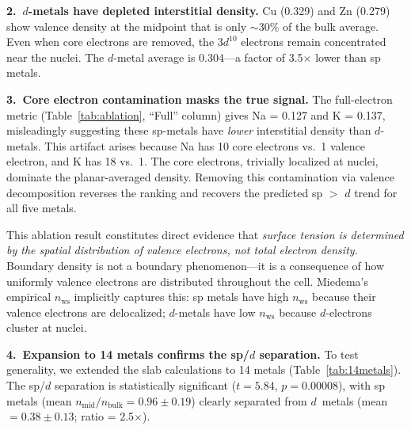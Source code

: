 \documentclass[twocolumn,showpacs,preprintnumbers,amsmath,amssymb,prb]{revtex4-2}
\begin{document}
\textbf{2.\ $d$-metals have depleted interstitial density.}
Cu (0.329) and Zn (0.279) show valence density at the
midpoint that is only $\sim\!30\%$ of the bulk average.
Even when core electrons are removed, the $3d^{10}$
electrons remain concentrated near the nuclei.
The $d$-metal average is 0.304---a factor of 3.5$\times$
lower than sp metals.

\textbf{3.\ Core electron contamination masks the true signal.}
The full-electron metric (Table~\ref{tab:ablation}, ``Full''
column) gives Na = 0.127 and K = 0.137, misleadingly
suggesting these sp-metals have \emph{lower} interstitial
density than $d$-metals.
This artifact arises because Na has 10 core electrons
vs.\ 1 valence electron, and K has 18 vs.\ 1.
The core electrons, trivially localized at nuclei,
dominate the planar-averaged density.
Removing this contamination via valence decomposition
reverses the ranking and recovers the predicted sp $>$ $d$
trend for all five metals.

This ablation result constitutes direct evidence that
\emph{surface tension is determined by the spatial
distribution of valence electrons, not total electron density.}
Boundary density is not a boundary phenomenon---it is a
consequence of how uniformly valence electrons are distributed
throughout the cell.
Miedema's empirical $n_\mathrm{ws}$ implicitly captures this:
sp metals have high $n_\mathrm{ws}$ because their valence
electrons are delocalized; $d$-metals have low $n_\mathrm{ws}$
because $d$-electrons cluster at nuclei.

\textbf{4.\ Expansion to 14 metals confirms the sp/$d$ separation.}
To test generality, we extended the slab calculations to
14 metals (Table~\ref{tab:14metals}).
The sp/$d$ separation is statistically significant
($t = 5.84$, $p = 0.00008$), with sp metals
(mean $n_\mathrm{mid}/n_\mathrm{bulk} = 0.96 \pm 0.19$)
clearly separated from $d$~metals
(mean $= 0.38 \pm 0.13$; ratio = 2.5$\times$).
\end{document}

